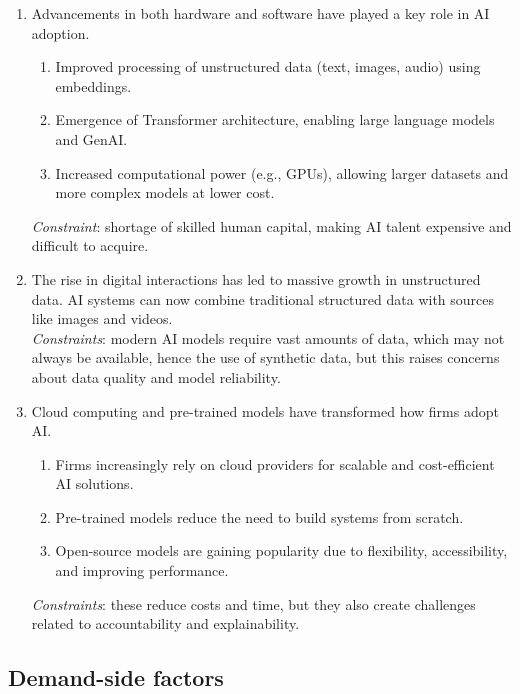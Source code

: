 \begin{enumerate}
\item {} Advancements in both hardware and software have
played a key role in AI adoption.
  \begin{enumerate}[label=\alph*)]
  \item Improved processing of unstructured data (text, images, audio) using embeddings.
  \item Emergence of Transformer architecture, enabling large language models and GenAI.
  \item Increased computational power (e.g., GPUs), allowing larger datasets and more complex
  models at lower cost.
  \end{enumerate}
  \emph{Constraint}: shortage of skilled human capital, making AI talent expensive and
  difficult to acquire.
\item {} The rise in digital interactions has led to massive
growth in unstructured data. AI systems can now combine traditional structured data with
sources like images and videos.\\
  \emph{Constraints}: modern AI models require vast amounts of data, which may not always be
  available, hence the use of synthetic data, but this raises concerns about data quality and
  model reliability.
\item {} Cloud computing and pre-trained models have
transformed how firms adopt AI.
  \begin{enumerate}[label=\alph*)]
  \item Firms increasingly rely on cloud providers for scalable and cost-efficient AI
  solutions.
  \item Pre-trained models reduce the need to build systems from scratch.
  \item Open-source models are gaining popularity due to flexibility, accessibility, and
  improving performance.
  \end{enumerate}
  \emph{Constraints}: these reduce costs and time, but they also create challenges related to
  accountability and explainability.
\end{enumerate}

\subsection*{Demand-side factors}

